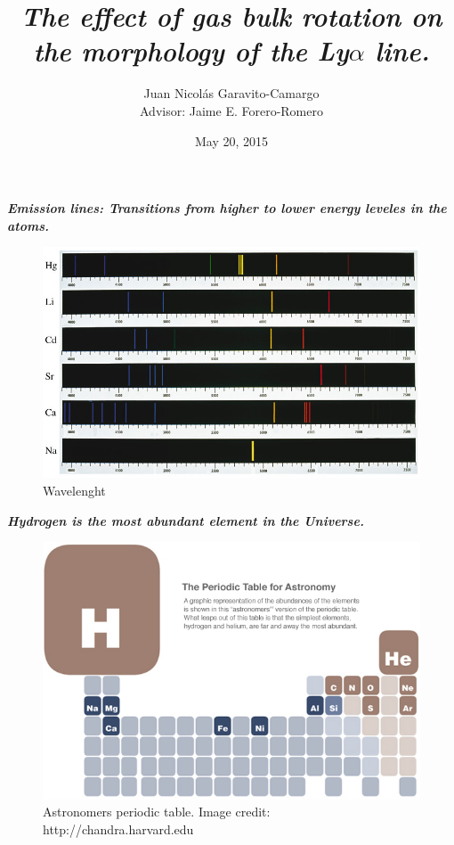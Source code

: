 \documentclass{beamer}
\title{\textit{\textbf{The effect of gas bulk rotation on the morphology of the Ly$\alpha$ line.}}}
\author{Juan Nicol\'as Garavito-Camargo \\ Advisor: Jaime E. Forero-Romero}
\institute{Universidad de los Andes, Bogot\'a, Colombia}
\date{May 20, 2015}
\begin{document}

\begin{frame}{\textit{\textbf{Emission lines: Transitions from higher to lower energy leveles in the atoms.}}}
\begin{figure}
\includegraphics[scale=0.35]{Figures/emission.jpg}
\caption*{Wavelenght}
\end{figure}
\end{frame}

\begin{frame}{\textit{\textbf{Hydrogen is the most abundant element in the Universe.}}}
\begin{figure}
\includegraphics[scale=0.3]{Figures/astronomy_table.jpg}
\caption{Astronomers periodic table. Image credit: http://chandra.harvard.edu}
\end{figure}
\end{frame}
\end{document}
